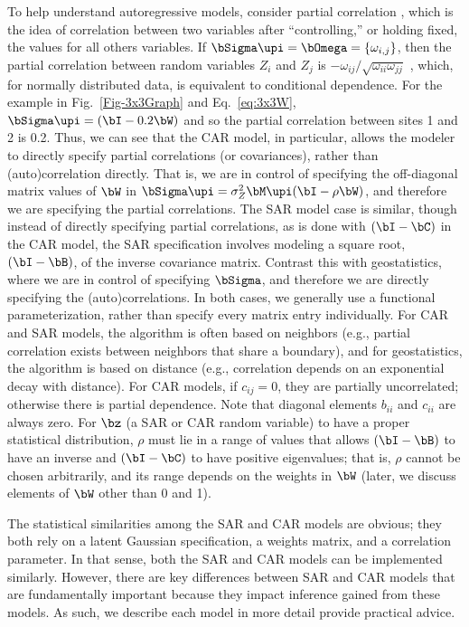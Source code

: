 To help understand autoregressive models, consider partial correlation \citep[e.g.,][pg. 361]{Sned:Coch:stat:1980}, which is the idea of correlation between two variables after ``controlling,'' or holding fixed, the values for all others variables. If $\bSigma\upi = \bOmega = \{\omega_{i,j}\}$, then the partial correlation between random variables $Z_i$ and $Z_j$ is $-\omega_{ij}/\sqrt{\omega_{ii}\omega_{jj}}$ \citep[pg. 120]{Laur:grap:1996}, which, for normally distributed data, is equivalent to conditional dependence. For the example in Fig.~\ref{Fig-3x3Graph} and Eq.~\ref{eq:3x3W}, $\bSigma\upi = (\bI - 0.2\bW)$ and so the partial correlation between sites 1 and 2 is 0.2. Thus, we can see that the CAR model, in particular, allows the modeler to directly specify partial correlations (or covariances), rather than (auto)correlation directly. That is, we are in control of specifying the off-diagonal matrix values of $\bW$ in $\bSigma\upi = \sigma^2_Z\bM\upi(\bI-\rho\bW)$, and therefore we are specifying the partial correlations. The SAR model case is similar, though instead of directly specifying partial correlations, as is done with $(\bI - \bC)$ in the CAR model, the SAR specification involves modeling a square root, $(\bI - \bB)$, of the inverse covariance matrix. Contrast this with geostatistics, where we are in control of specifying $\bSigma$, and therefore we are directly specifying the (auto)correlations.  In both cases, we generally use a functional parameterization, rather than specify every matrix entry individually.  For CAR and SAR models, the algorithm is often based on neighbors (e.g., partial correlation exists between neighbors that share a boundary), and for geostatistics, the algorithm is based on distance (e.g., correlation depends on an exponential decay with distance). For CAR models, if $c_{ij} = 0$, they are partially uncorrelated; otherwise there is partial dependence. Note that diagonal elements $b_{ii}$ and $c_{ii}$ are always zero.  For $\bz$ (a SAR or CAR random variable) to have a proper statistical distribution, $\rho$ must lie in a range of values that allows $(\bI-\bB)$ to have an inverse and $(\bI - \bC)$ to have positive eigenvalues; that is, $\rho$ cannot be chosen arbitrarily, and its range depends on the weights in $\bW$ (later, we discuss elements of $\bW$ other than 0 and 1).

The statistical similarities among the SAR and CAR models are obvious; they both rely on a latent Gaussian specification, a weights matrix, and a correlation parameter. In that sense, both the SAR and CAR models can be implemented similarly. However, there are key differences between SAR and CAR models that are fundamentally important because they impact inference gained from these models. As such, we describe each model in more detail provide practical advice.

